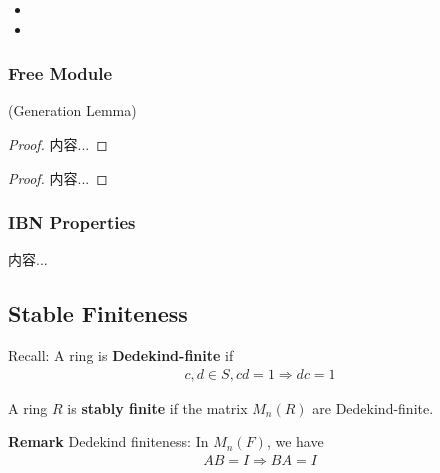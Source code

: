 \documentclass[Total.tex]{subfiles}
\begin{document}
	\begin{Def}
		\begin{itemize}
			\item 
			\item 
		\end{itemize}
	\end{Def}
	\subsubsection{Free Module}
	
	\begin{lemma}
		(Generation Lemma)
	\end{lemma}
	\begin{proof}
		内容...
	\end{proof}
	
	\begin{corollary}
		
	\end{corollary}
	\begin{proof}
		内容...
	\end{proof}
	\subsubsection{IBN Properties}
	
	\begin{Def}
		内容...
	\end{Def}
	\subsection{Stable Finiteness}
	\begin{Def}
		Recall: A ring is \textbf{Dedekind-finite} if
		\begin{gather*}
			c,d\in S,cd=1\Rightarrow dc=1
		\end{gather*}
		
		A ring $R$ is \textbf{stably finite} if the matrix $M_n(R)$ are Dedekind-finite.
	\end{Def}
	
	\textbf{Remark} Dedekind finiteness: In $M_n(F)$, we have
	\begin{gather*}
		AB=I\Rightarrow BA=I
	\end{gather*}
	
\end{document}
